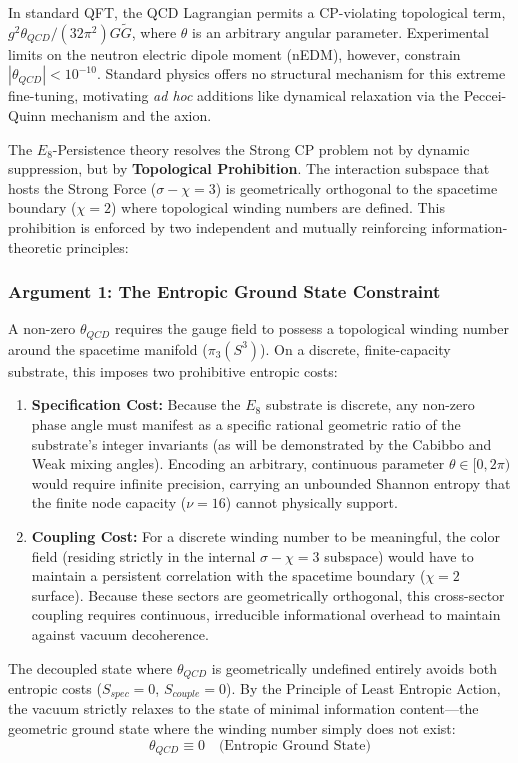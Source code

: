 In standard QFT, the QCD Lagrangian permits a CP-violating topological term, $g^2\theta_{QCD}/(32\pi^2) G\tilde{G}$, where $\theta$ is an arbitrary angular parameter. Experimental limits on the neutron electric dipole moment (nEDM), however, constrain $|\theta_{QCD}| < 10^{-10}$. Standard physics offers no structural mechanism for this extreme fine-tuning, motivating \textit{ad hoc} additions like dynamical relaxation via the Peccei-Quinn mechanism and the axion.

The $E_8$-Persistence theory resolves the Strong CP problem not by dynamic suppression, but by \textbf{Topological Prohibition}. The interaction subspace that hosts the Strong Force ($\sigma-\chi=3$) is geometrically orthogonal to the spacetime boundary ($\chi=2$) where topological winding numbers are defined. This prohibition is enforced by two independent and mutually reinforcing information-theoretic principles:

\subsubsection{Argument 1: The Entropic Ground State Constraint}
A non-zero $\theta_{QCD}$ requires the gauge field to possess a topological winding number around the spacetime manifold ($\pi_3(S^3)$). On a discrete, finite-capacity substrate, this imposes two prohibitive entropic costs:
\begin{enumerate}
    \item \textbf{Specification Cost:} Because the $E_8$ substrate is discrete, any non-zero phase angle must manifest as a specific rational geometric ratio of the substrate's integer invariants (as will be demonstrated by the Cabibbo and Weak mixing angles). Encoding an arbitrary, continuous parameter $\theta \in[0, 2\pi)$ would require infinite precision, carrying an unbounded Shannon entropy that the finite node capacity ($\nu=16$) cannot physically support.
    \item \textbf{Coupling Cost:} For a discrete winding number to be meaningful, the color field (residing strictly in the internal $\sigma-\chi=3$ subspace) would have to maintain a persistent correlation with the spacetime boundary ($\chi=2$ surface). Because these sectors are geometrically orthogonal, this cross-sector coupling requires continuous, irreducible informational overhead to maintain against vacuum decoherence.
\end{enumerate}
The decoupled state where $\theta_{QCD}$ is geometrically undefined entirely avoids both entropic costs ($S_{spec}=0$, $S_{couple}=0$). By the Principle of Least Entropic Action, the vacuum strictly relaxes to the state of minimal information content—the geometric ground state where the winding number simply does not exist:
\begin{equation}
    \theta_{QCD} \equiv 0 \quad \text{(Entropic Ground State)}
\end{equation}

